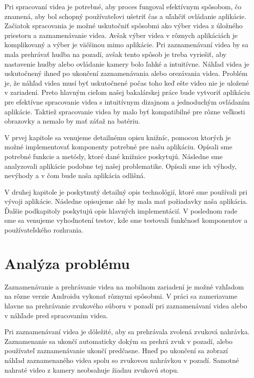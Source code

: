 \documentclass[12pt, oneside]{book}
\begin{document}
Pri spracovaní videa je potrebné, aby proces fungoval efektívnym spôsobom, čo znamená, aby bol schopný používateľovi ušetriť čas a uľahčiť ovládanie aplikácie. Začiatok spracovania je možné uskutočniť spôsobmi ako výber videa z úložného priestoru a zaznamenávanie videa. Avšak výber videa v rôznych aplikáciách je komplikovaný a výber je väčšinou mimo aplikácie. Pri zaznamenávaní videa by sa mala prehrávať hudba na pozadí, avšak tento spôsob je treba vyriešiť, aby nastavenie hudby alebo ovládanie kamery bolo ľahké a intuitívne. Náhľad videa je uskutočnený ihneď po ukončení zaznamenávania alebo orezávania videa. Problém je, že náhľad videa musí byť uskutočnené počas toho keď ešte video nie je uložené v zariadení. Preto hlavným cieľom našej bakalárskej práce bude vytvoriť aplikáciu pre efektívne spracovanie videa s intuitívnym dizajnom a jednoduchým ovládaním aplikácie. Taktiež spracovanie videa by malo byť kompatibilné pre rôzne veľkosti obrazovky a nemalo by mať záťaž na batériu.

V prvej kapitole sa venujeme detailnému opisu knižníc, pomocou ktorých je možné implementovať komponenty potrebné pre našu aplikáciu. Opísali sme potrebné funkcie a metódy, ktoré dané knižnice poskytujú. Následne sme analyzovali aplikácie podobne tej našej problematike. Opísali sme ich výhody, nevýhody a v čom bude naša aplikácia odlišná.

V druhej kapitole je poskytnutý detailný opis technológií, ktoré sme používali pri vývoji aplikácie. Následne opisujeme aké by mala mať požiadavky naša aplikácia. Ďalšie podkapitoly poskytujú opis hlavných implementácií. V poslednom rade sme sa venujeme vyhodnotení testov, kde sme testovali funkčnosť komponentov a používateľského rozhrania.



\newpage
\chapter{Analýza problému}

\hspace{15pt} Zaznamenávanie a prehrávanie videa na mobilnom zariadení je možné vzhľadom na rôzne verzie Androidu vykonať rôznymi spôsobmi. V práci sa zameriavame hlavne na prehrávanie zvukového súboru v pozadí pri zaznamenávaní videa alebo v náhľade pred spracovaním videa. 

Pri zaznamenávaní videa je dôležité, aby sa prehrávala zvolená zvuková nahrávka. Zaznamenanie sa ukončí automaticky dokým sa prehrá zvuk v pozadí, alebo používateľ zaznamenávanie ukončí predčasne. Hneď po ukončení sa zobrazí náhľad zaznamenaného videa spolu so zvukovou nahrávkou v pozadí. Samotné nahraté video z kamery neobsahuje žiadnu zvukovú stopu.
\end{document}
